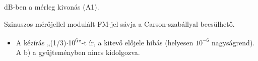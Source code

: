 dB-ben a mérleg kivonás (A1).

\begin{center}\end{center}

\begin{center}\end{center}

Szinuszos mérőjellel modulált FM-jel sávja a Carson-szabállyal becsülhető.

\begin{center}\end{center}
\begin{eredmeny}

\begin{center}\end{center}
\end{eredmeny}
\begin{tipp}[Ellenőrzés]
\begin{itemize}
\item A kézírás „(1/3)$\cdot$10\textsuperscript{6}”-t ír, a kitevő előjele hibás (helyesen $10^{-6}$ nagyságrend). A b) a gyűjteményben nincs kidolgozva.
\end{itemize}
\end{tipp}



